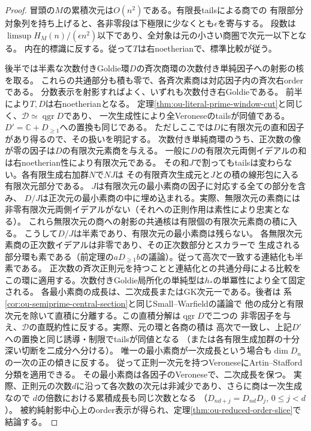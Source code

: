 \documentclass[11pt,a4paper]{ltjsarticle}
\theoremstyle{definition}
\newcommand{\qgr}{\operatorname{qgr}}
\begin{document}
\begin{proof}
冒頭の$M$の累積次元は$O(n^2)$である。有限長tailsによる商での
有限部分対象列を持ち上げると、各非零段は下極限に少なくとも$\epsilon$を寄与する。
段数は$\limsup H_M(n)/(\epsilon n^2)$以下であり、全対象は元の小さい商圏で次元一以下となる。
内在的標識に反する。従って$T$は右noetherianで、標準比較が従う。

後半では半素な次数付きGoldie環$D$の斉次商環の次数付き単純因子への射影の核を取る。
これらの共通部分も積も零で、各斉次素商は対応因子内の斉次右orderである。
分数表示を射影すればよく、いずれも次数付き右Goldieである。
前半により$T,D$は右noetherianとなる。
定理\ref{thm:ou-literal-prime-window-cut}と同じく、$\mathcal D\simeq\qgr D$であり、
一次生成性により全Veroneseのtailsが同値である。
$D'=\mathbb C+D_{\ge1}$への置換も同じである。
ただしここでは$D$に有限次元の直和因子があり得るので、その扱いを明記する。
次数付き単純商環のうち、正次数の像が零の因子は$D$の有限次元素商を与える。
一般に$D$の有限次元両側イデアルの和は右noetherian性により有限次元である。
その和$J$で割ってもtailsは変わらない。各有限生成右加群$N$で$NJ$は
その有限斉次生成元と$J$との積の線形包に入る有限次元部分である。
$J$は有限次元の最小素商の因子に対応する全ての部分を含み、
$D/J$は正次元の最小素商の中に埋め込まれる。実際、無限次元の素商には
非零有限次元両側イデアルがない（それへの正則作用は素性により忠実となる）。
これら無限次元の商への射影の共通核は有限個の有限次元素商の積に入る。
こうして$D/J$は半素であり、有限次元の最小素商は残らない。
各無限次元素商の正次数イデアルは非零であり、その正次数部分とスカラーで
生成される部分環も素である（前定理の$aD_{\ge1}b$の議論）。従って高次で一致する連結化も半素である。
正次数の斉次正則元を持つことと連結化との共通分母による比較を
この環に適用する。次数付きGoldie局所化の単純型は$h_*$の単冪性により全て固定される。
各最小素商の成長は、二次成長またはGK次元一である。後者は
系\ref{cor:ou-semiprime-central-section}と同じSmall--Warfieldの議論で
他の成分と有限次元を除いて直積に分離する。この直積分解は$\qgr D$で二つの
非零因子を与え、$\mathcal D$の直既約性に反する。実際、元の環と各商の積は
高次で一致し、上記$D'$への置換と同じ誘導・制限でtailsが同値となる
（または各有限生成加群の十分深い切断を二成分へ分ける）。
唯一の最小素商が一次成長という場合も$\dim D_n$の一次の正の傾きに反する。
従って正則一次元を持つVeroneseにArtin--Stafford分類を適用できる。
その最小素商は各因子のVeroneseで、二次成長を保つ。
実際、正則元の次数$d$に沿って各次数の次元は非減少であり、さらに商は一次生成なので
$d$の倍数における累積成長も同じ次数となる
（$D_{nd+j}=D_{nd}D_j$, $0\le j<d$）。
被約純射影中心上のorder表示が得られ、定理\ref{thm:ou-reduced-order-slice}で結論する。
\end{proof}
\end{document}
